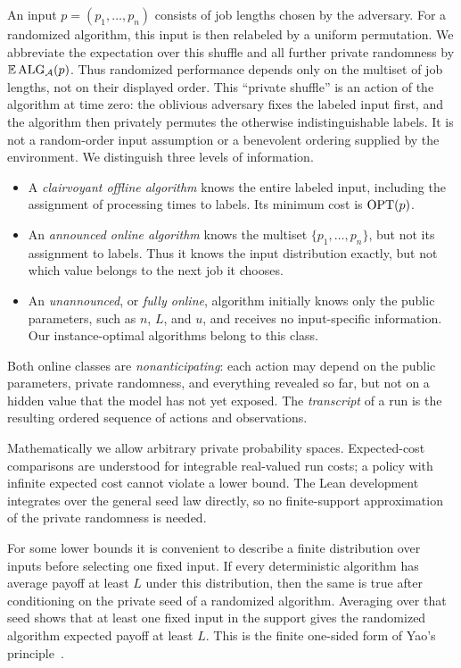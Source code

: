 An input $p=(p_1,\ldots,p_n)$ consists of job lengths chosen by the
adversary.  For a randomized algorithm, this input is then relabeled by a
uniform permutation.  We abbreviate the expectation over this shuffle and
all further private randomness by $\mathbb{E}\operatorname{ALG}_{\mathcal A}(p)$.  Thus randomized
performance depends only on the multiset of job lengths, not on their displayed
order.  This ``private shuffle'' is an action of the algorithm at time zero:
the oblivious adversary fixes the labeled input first, and the algorithm
then privately permutes the otherwise indistinguishable labels.  It is not a
random-order input assumption or a benevolent ordering supplied by the
environment.  We distinguish three levels of information.
\begin{itemize}
\item A \emph{clairvoyant offline algorithm} knows the entire labeled input,
including the assignment of processing times to labels.  Its minimum cost is
$\operatorname{OPT}(p)$.
\item An \emph{announced online algorithm} knows the multiset
$\{p_1,\ldots,p_n\}$, but not its assignment to labels.  Thus it knows the
input distribution exactly, but not which value belongs to the next job it
chooses.
\item An \emph{unannounced}, or \emph{fully online}, algorithm initially knows
only the public parameters, such as $n$, $L$, and $u$, and receives no
input-specific information.  Our instance-optimal algorithms belong to this
class.
\end{itemize}
Both online classes are \emph{nonanticipating}: each action may depend on the
public parameters, private randomness, and everything revealed so far, but
not on a hidden value that the model has not yet exposed.
The \emph{transcript} of a run is the resulting ordered sequence of actions
and observations.

Mathematically we allow arbitrary private probability spaces.  Expected-cost
comparisons are understood for integrable real-valued run costs; a policy with
infinite expected cost cannot violate a lower bound.  The Lean development
integrates over the general seed law directly, so no finite-support
approximation of the private randomness is needed.

For some lower bounds it is convenient to describe a finite distribution
over inputs before selecting one fixed input.  If every deterministic
algorithm has average payoff at least $L$ under this distribution, then the
same is true after conditioning on the private seed of a randomized
algorithm.  Averaging over that seed shows that at least one fixed input in
the support gives the randomized algorithm expected payoff at least $L$.
This is the finite one-sided form of Yao's principle~\cite{Yao1977}.


